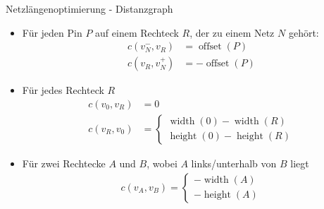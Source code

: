 \documentclass{beamer}
\DeclareMathOperator{\hoehe}{height}
\DeclareMathOperator{\breite}{width}
\DeclareMathOperator{\ausmenge}{offset}
\begin{document}
\begin{frame}{Netzlängenoptimierung - Distanzgraph}
 \begin{itemize}
   \item Für jeden Pin $P$ auf einem Rechteck $R$, der zu einem Netz $N$ gehört:
   \begin{align*}
    c(v_N^-, v_R) &= \ausmenge(P)\\
    c(v_R, v_N^+) &= -\ausmenge(P)
   \end{align*}
   \item Für jedes Rechteck $R$
   \begin{align*}
    c(v_0, v_R) &= 0 \\
    c(v_R, v_0) &= \begin{cases}\breite(0) - \breite(R) \\ \hoehe(0) - \hoehe(R)\end{cases}
   \end{align*}
   \item Für zwei Rechtecke $A$ und $B$, wobei $A$ links/unterhalb von $B$ liegt
   \begin{align*}
    c(v_A, v_B) = \begin{cases} -\breite(A) \\
    -\hoehe(A)\end{cases}
   \end{align*}
 \end{itemize}

\end{frame}
\end{document}

